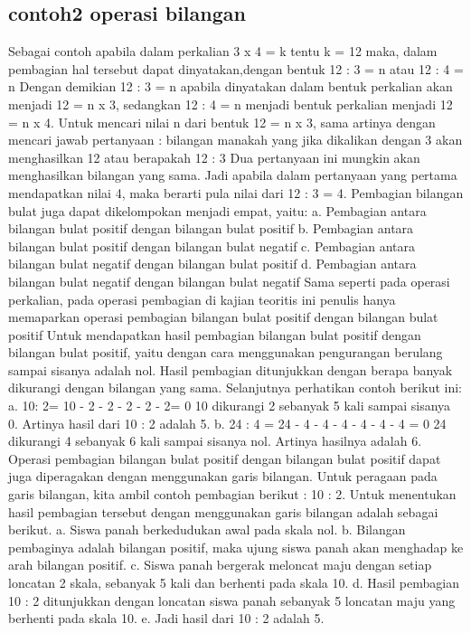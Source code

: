 \subsection{contoh2 operasi bilangan}
Sebagai contoh apabila dalam perkalian 3 x 4 = k tentu k = 12 maka, dalam pembagian hal tersebut dapat dinyatakan,dengan bentuk 12 : 3 = n atau 12 : 4 = n
Dengan demikian 12 : 3 = n apabila dinyatakan dalam bentuk perkalian akan menjadi 12 = n x 3, sedangkan 12 : 4 = n menjadi bentuk perkalian menjadi 12 = n x 4. Untuk mencari nilai n dari bentuk 12 = n x 3, sama artinya dengan mencari jawab pertanyaan : bilangan manakah yang jika dikalikan dengan 3 akan menghasilkan 12 atau berapakah 12 : 3  Dua pertanyaan ini mungkin akan menghasilkan bilangan yang sama. Jadi apabila dalam pertanyaan yang pertama mendapatkan nilai 4, maka berarti pula nilai dari 12 : 3 = 4.
Pembagian bilangan bulat juga dapat dikelompokan menjadi empat, yaitu:
a. Pembagian antara bilangan bulat positif dengan bilangan bulat positif 
b. Pembagian antara bilangan bulat positif dengan bilangan bulat negatif 
c. Pembagian antara bilangan bulat negatif dengan bilangan bulat positif 
d. Pembagian antara bilangan bulat negatif dengan bilangan bulat negatif Sama seperti pada operasi perkalian, pada operasi pembagian di kajian teoritis ini penulis hanya memaparkan operasi pembagian bilangan bulat positif dengan bilangan bulat positif
Untuk mendapatkan hasil pembagian bilangan bulat positif dengan bilangan bulat positif, yaitu dengan cara menggunakan pengurangan berulang sampai sisanya adalah nol. Hasil pembagian ditunjukkan dengan berapa banyak dikurangi dengan bilangan yang sama. Selanjutnya perhatikan contoh berikut ini: a. 10: 2= 10 - 2 - 2 - 2 - 2 - 2= 0 10 dikurangi 2 sebanyak 5 kali sampai sisanya 0. Artinya hasil dari 10 : 2 adalah 5. b. 24 : 4 = 24 - 4 - 4 - 4 - 4 - 4 - 4 = 0 24 dikurangi 4 sebanyak 6 kali sampai sisanya nol.
 Artinya hasilnya adalah 6. Operasi pembagian bilangan bulat positif dengan bilangan bulat positif dapat juga diperagakan dengan menggunakan garis bilangan. Untuk peragaan pada garis bilangan, kita ambil contoh pembagian berikut : 10 : 2. Untuk menentukan hasil pembagian tersebut dengan menggunakan garis bilangan adalah sebagai berikut. a. Siswa panah berkedudukan awal pada skala nol. b. Bilangan pembaginya adalah bilangan positif, maka ujung siswa panah akan menghadap ke arah bilangan positif. c. Siswa panah bergerak meloncat maju dengan setiap loncatan 2 skala, sebanyak 5 kali dan berhenti pada skala 10. d. Hasil pembagian 10 : 2 ditunjukkan dengan loncatan siswa panah sebanyak 5 loncatan maju yang berhenti pada skala 10. e. Jadi hasil dari 10 : 2 adalah 5.

